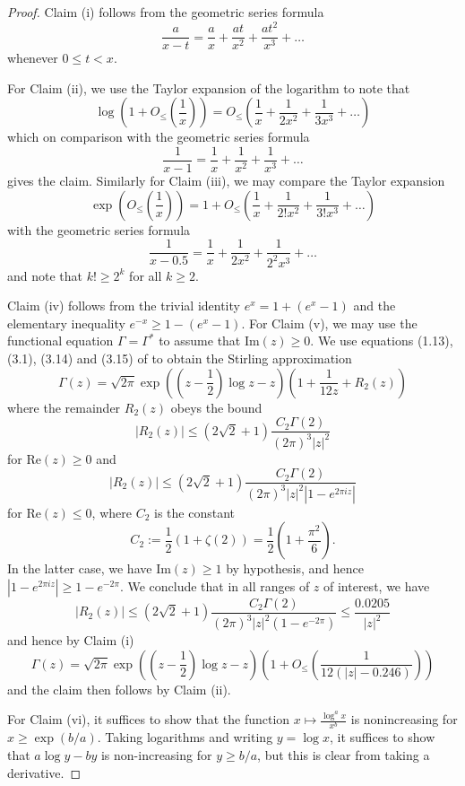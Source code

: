 \begin{proof}  Claim (i) follows from the geometric series formula
$$ \frac{a}{x-t} = \frac{a}{x} + \frac{at}{x^2} + \frac{at^2}{x^3} + \dots$$
whenever $0 \leq t < x$.

For Claim (ii), we use the Taylor expansion of the logarithm to note that
$$\log\left( 1 + O_{\leq}\left(\frac{1}{x}\right) \right) = O_{\leq}\left(\frac{1}{x} + \frac{1}{2x^2} + \frac{1}{3x^3} + \dots\right)$$
which on comparison with the geometric series formula
$$\frac{1}{x-1} = \frac{1}{x} + \frac{1}{x^2} + \frac{1}{x^3} + \dots$$
gives the claim.  Similarly for Claim (iii), we may compare the Taylor expansion
$$\exp\left( O_{\leq}\left(\frac{1}{x}\right) \right) = 1 + O_{\leq}\left(\frac{1}{x} + \frac{1}{2! x^2} + \frac{1}{3! x^3} + \dots\right)$$
with the geometric series formula
$$ \frac{1}{x-0.5} = \frac{1}{x} + \frac{1}{2x^2} + \frac{1}{2^2 x^3} + \dots$$
and note that $k! \geq 2^k$ for all $k \geq 2$.

Claim (iv) follows from the trivial identity $e^x = 1 + (e^x-1)$ and the elementary inequality $e^{-x} \geq 1 - (e^x-1)$.
For Claim (v), we may use the functional equation $\Gamma = \Gamma^*$ to assume that $\mathrm{Im}(z) \geq 0$.  We use equations (1.13), (3.1), (3.14) and (3.15) of \cite{boyd} to obtain the Stirling approximation
$$ \Gamma(z) = \sqrt{2\pi} \exp\left( \left(z-\frac{1}{2}\right) \log z - z \right) \left(1 + \frac{1}{12 z} + R_2(z) \right)$$
where the remainder $R_2(z)$ obeys the bound
$$ |R_2(z)| \leq (2 \sqrt{2}+1) \frac{C_2 \Gamma(2)}{(2\pi)^3 |z|^2} $$
for $\mathrm{Re}(z) \geq 0$ and
$$|R_2(z)| \leq (2 \sqrt{2}+1) \frac{C_2 \Gamma(2)}{(2\pi)^3 |z|^2 |1 - e^{2\pi i z}|} $$
for $\mathrm{Re}(z) \leq 0$, where $C_2$ is the constant
$$ C_2 := \frac{1}{2} (1 + \zeta(2)) = \frac{1}{2} \left(1 + \frac{\pi^2}{6}\right).$$
In the latter case, we have $\mathrm{Im}(z) \geq 1$ by hypothesis, and hence $|1 - e^{2\pi i z}| \geq 1 - e^{-2\pi}$.  We conclude that in all ranges of $z$ of interest, we have
$$|R_2(z)| \leq (2 \sqrt{2}+1) \frac{C_2 \Gamma(2)}{(2\pi)^3 |z|^2 (1 - e^{-2\pi})} \leq \frac{0.0205}{|z|^2}$$
and hence by Claim (i)
$$ \Gamma(z) = \sqrt{2\pi} \exp\left( \left(z-\frac{1}{2}\right) \log z - z \right) \left(1 + O_{\leq}\left( \frac{1}{12(|z| - 0.246)} \right)\right) $$
and the claim then follows by Claim (ii).  

For Claim (vi), it suffices to show that the function $x \mapsto \frac{\log^a x}{x^b}$ is nonincreasing for $x \geq \exp(b/a)$.  Taking logarithms and writing $y = \log x$, it suffices to show that $a \log y - by$ is non-increasing for $y \geq b/a$, but this is clear from taking a derivative.
\end{proof}
